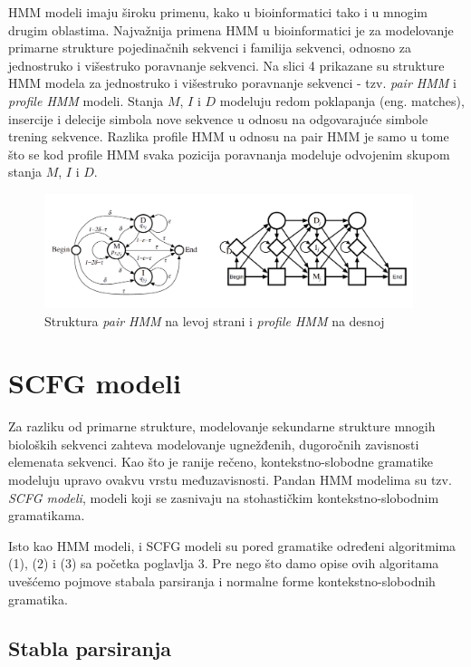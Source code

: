 \documentclass[a4paper, 12pt]{article}
\begin{document}
HMM modeli imaju široku primenu, kako u bioinformatici tako i u mnogim drugim oblastima. Najvažnija primena HMM u bioinformatici je za modelovanje primarne strukture pojedinačnih sekvenci i familija sekvenci, odnosno za jednostruko i višestruko poravnanje sekvenci. Na slici 4 prikazane su strukture HMM modela za jednostruko i višestruko poravnanje sekvenci - tzv. \textit{pair HMM} i \textit{profile HMM} modeli. Stanja $M$, $I$ i $D$  modeluju redom poklapanja (eng. matches), insercije i delecije simbola nove sekvence u odnosu na odgovarajuće simbole trening sekvence. Razlika profile HMM u odnosu na pair HMM je samo u tome što se kod profile HMM svaka pozicija poravnanja modeluje odvojenim skupom stanja $M$, $I$ i $D$.

\begin{figure}[h!]
  \centering
  \vspace{-0.1cm}
  \includegraphics[width=0.96\textwidth]{HMM}
  \caption{Struktura \textit{pair HMM} na levoj strani i \textit{profile HMM} na desnoj}
\end{figure}

\newpage
\section{SCFG modeli}

Za razliku od primarne strukture, modelovanje sekundarne strukture mnogih bioloških sekvenci zahteva modelovanje ugnežđenih, dugoročnih zavisnosti elemenata sekvenci. Kao što je ranije rečeno, kontekstno-slobodne gramatike modeluju upravo ovakvu vrstu međuzavisnosti. Pandan HMM modelima su tzv. \textit{SCFG modeli}, modeli koji se zasnivaju na stohastičkim kontekstno-slobodnim gramatikama.

Isto kao HMM modeli, i SCFG modeli su pored gramatike određeni algoritmima (1), (2) i (3) sa početka poglavlja 3. Pre nego što damo opise ovih algoritama uvešćemo pojmove stabala parsiranja i normalne forme kontekstno-slobodnih gramatika.

\subsection{Stabla parsiranja}
\end{document}
